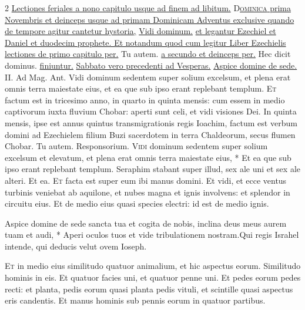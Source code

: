 \begin{multicols*}{2}
\newline \ul{Lectiones feriales a nono capitulo usque ad finem ad libitum.}
\lettrine[lines=2]{\zallmancaps \color{Blue} D}{}\ul{\textsc{ominica} prima Novembris et deinceps usque ad primam Dominicam Adventus exclusive quando de tempore agitur cantetur hystoria,} \hyperlink{vidi-dominum}{Vidi dominum.} \ul{et legantur Ezechiel et Daniel et duodecim prophete. Et notandum quod cum legitur Liber Ezechielis lectiones de primo capitulo per.} Tu autem. \ul{a secundo et deinceps per.} Hec dicit dominus. \ul{finiuntur.}
{\color{Red} }
\newline \ul{Sabbato vero precedenti ad Vesperas.} \R \hyperlink{aspice-domine-de}{Aspice domine de sede.} {\color{Red} II. Ad Mag. Ant.} Vidi dominum sedentem super solium excelsum, et plena erat omnis terra maiestate eius, et ea que sub ipso erant replebant templum.
\lettrine[lines=2]{\zallmancaps \color{Red} E}{t} factum est in tricesimo anno, in quarto in quinta mensis: cum essem in medio captivorum iuxta fluvium Chobar: aperti sunt celi, et vidi visiones Dei. In quinta mensis, ipse est annus quintus transmigrationis regis Ioachim, factum est verbum domini ad Ezechielem filium Buzi sacerdotem in terra Chaldeorum, secus flumen Chobar. Tu autem. {\color{Red} Responsorium.}
\lettrine[lines=2]{\zallmancaps \color{Blue} V}{idi} \hypertarget{vidi-dominum}{\label{vidi-dominum}} dominum sedentem super solium excelsum et elevatum, et plena erat omnis terra maiestate eius, * Et ea que sub ipso erant replebant templum. \V Seraphim stabant super illud, sex ale uni et sex ale alteri. Et ea.
\lettrine[lines=2]{\zallmancaps \color{Blue} E}{t} facta est super eum ibi manus domini. Et vidi, et ecce ventus turbinis veniebat ab aquilone, et nubes magna et ignis involvens: et splendor in circuitu eius. Et de medio eius quasi species electri: id est de medio ignis.
\begin{responsory}
{Aspice domine de sede sancta tua et cogita de nobis, inclina deus meus aurem tuam et audi, * Aperi oculos tuos et vide tribulationem nostram.}{Qui regis Israhel intende, qui deducis velut ovem Ioseph.}
\end{responsory}%
\lettrine[lines=2]{\zallmancaps \color{Red} E}{t} in medio eius similitudo quatuor animalium, et hic aspectus eorum. Similitudo hominis in eis. Et quatuor facies uni, et quatuor penne uni. Et pedes eorum pedes recti: et planta, pedis eorum quasi planta pedis vituli, et scintille quasi aspectus eris candentis. Et manus hominis sub pennis eorum in quatuor partibus.

\end{multicols*}
